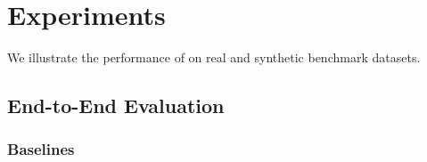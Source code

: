 \section{Experiments}\label{s:exp}
We illustrate the performance of \sys on real and synthetic benchmark datasets.

\subsection{End-to-End Evaluation}

\subsubsection{Baselines}
